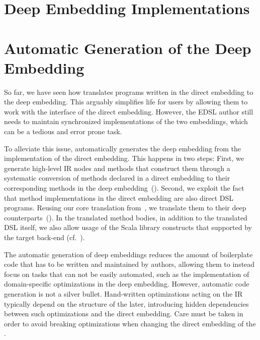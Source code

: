 \section{Deep Embedding Implementations}
\label{sec:deep-embedding-implementations}


\section{Automatic Generation of the Deep Embedding}
\label{sec:deep-gen}

So far, we have seen how \yy translates programs written in the
direct embedding to the deep embedding.
This arguably simplifies life for \edsl users by allowing them to work
with the interface
of the direct embedding.  However, the EDSL author still needs to
maintain synchronized implementations of the two embeddings, which can
be a tedious and error prone task.

To alleviate this issue, \yy automatically generates the deep embedding from
the implementation of the direct embedding. This happens in two steps: First, we
generate high-level IR nodes and methods that construct them through a
systematic conversion of methods declared in a direct embedding to their
corresponding methods in the deep embedding~().
%
Second, we exploit the fact that method implementations in the direct
embedding are also direct DSL programs.  Reusing our core translation
from~, we translate them to their deep
counterparts~().
In the translated method bodies, in addition to the translated DSL itself, we also allow
usage of the Scala library constructs that supported by the target back-end (cf.~\cite{techrep}).

The automatic generation of deep embeddings reduces the amount of
boilerplate code that has to be written and maintained by \edsl
authors, allowing them to instead focus on tasks that can not be
easily automated, such as the implementation of domain-specific
optimizations in the deep embedding.  However, automatic code
generation is not a silver bullet.  Hand-written optimizations acting
on the IR typically depend on the structure of the later, introducing
hidden dependencies between such optimizations and the direct
embedding.  Care must be taken in order to avoid breaking
optimizations when changing the direct embedding of the \edsl.

